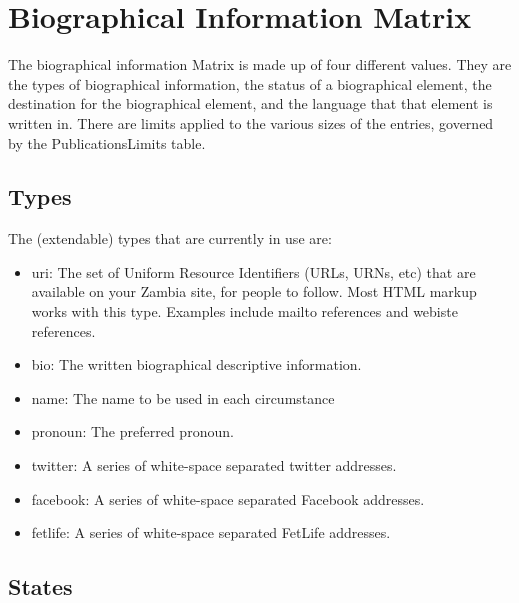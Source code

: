 \documentclass[captions=tablesignature]{scrartcl}
\begin{document}
\section{Biographical Information Matrix}
\label{sec-2}

The biographical information Matrix is made up of four different
values.  They are the types of biographical information, the status
of a biographical element, the destination for the biographical
element, and the language that that element is written in.  There
are limits applied to the various sizes of the entries, governed by
the PublicationsLimits table.
\subsection{Types}
\label{sec-2-1}

The (extendable) types that are currently in use are:
\begin{itemize}
\item uri: The set of Uniform Resource Identifiers (URLs, URNs, etc)
that are available on your Zambia site, for people to follow.
Most HTML markup works with this type.  Examples include mailto
references and webiste references.
\item bio: The written biographical descriptive information.
\item name: The name to be used in each circumstance
\item pronoun: The preferred pronoun.
\item twitter: A series of white-space separated twitter addresses.
\item facebook: A series of white-space separated Facebook addresses.
\item fetlife: A series of white-space separated FetLife addresses.
\end{itemize}

\subsection{States}
\label{sec-2-2}
\end{document}
